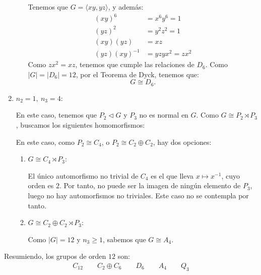 \begin{ejercicio}
\begin{enumerate}
\begin{itemize}
            Tenemos que $G=\langle xy,yz\rangle$, y además:
            \begin{align*}
                (xy)^6 &= x^6y^6 = 1\\
                (yz)^2 &= y^2z^2 = 1\\
                (xy)(yz) &= xz\\
                (yz)(xy)^{-1} &= yzyx^2=zx^2
            \end{align*}
            Como $zx^2=xz$, tenemos que cumple las relaciones de $D_6$. Como $|G|=|D_6|=12$, por el Teorema de Dyck, tenemos que:
            \begin{equation*}
                G\cong D_6.
            \end{equation*}
        \end{itemize}

        \item \ul{$n_2=1,\ n_3=4$}:
        
        En este caso, tenemos que \(P_2\lhd G\) y \(P_3\) no es normal en \(G\). Como $G\cong P_2\rtimes P_3$, buscamos los siguientes homomorfismos:

        En este caso, como $P_2\cong C_4$, o $P_2\cong C_2\oplus C_2$, hay dos opciones:
        \begin{enumerate}
            \item $G\cong C_4\rtimes P_3$:
            
            El único automorfismo no trivial de \(C_4\) es el que lleva \(x\mapsto x^{-1}\), cuyo orden es \(2\). Por tanto, no puede ser la imagen de ningún elemento de \(P_3\), luego no hay automorfismos no triviales. Este caso no se contempla por tanto.

            \item $G\cong C_2\oplus C_2\rtimes P_3$:
            
            Como $|G|=12$ y $n_3\geq 1$, sabemos que $G\cong A_4$.
        \end{enumerate}
    \end{enumerate}

    Resumiendo, los grupos de orden \(12\) son:
    \begin{gather*}
        C_{12} \qquad C_2\oplus C_6 \qquad D_6 \qquad A_4\qquad Q_3
    \end{gather*}
\end{ejercicio}